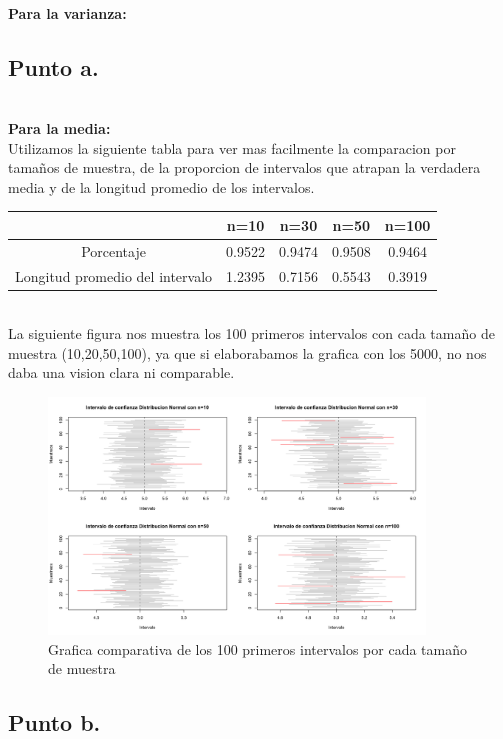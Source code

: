 \documentclass[letterpaper,12pt,onecolumn,titlepage]{article}
\begin{document}
~\\ \textbf{Para la varianza:}
\subsection{Punto a.}
~\\ \textbf{Para la media:}
~\\ Utilizamos la siguiente tabla para ver mas facilmente la comparacion por tama\~{n}os de muestra, de la proporcion de intervalos que atrapan la verdadera media y de la longitud promedio de los intervalos.
\begin{center}
\begin{tabular}{|c|c|c|c|c|}
\hline 
\rule[-1ex]{0pt}{2.5ex}  & n=10 & n=30 & n=50 & n=100 \\ 
\hline 
\rule[-1ex]{0pt}{2.5ex} Porcentaje & 0.9522 & 0.9474 & 0.9508 & 0.9464 \\ 
\hline 
\rule[-1ex]{0pt}{2.5ex} Longitud promedio del intervalo & 1.2395 & 0.7156 & 0.5543 & 0.3919 \\ 
\hline 
\end{tabular} 
\end{center}

~\\ La siguiente figura nos muestra los 100 primeros intervalos con cada tama\~{n}o de muestra (10,20,50,100), ya que si elaborabamos la grafica con los 5000, no nos daba una vision clara ni comparable. 
\begin{figure}[!h]
    \begin{center}
        \includegraphics[width=10cm]{Figuras/Punto1.png}
        \caption{Grafica comparativa de los 100 primeros intervalos por cada tama\~{n}o de muestra}
        \label{fig:Densidad}
    \end{center}
\end{figure}



\subsection{Punto b.}
\end{document}
